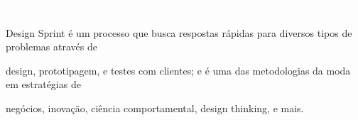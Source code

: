 \newcommand{\textBox}[1]{
\hspace*{7pt}
\begin{tabular}{  p{\dimexpr 0.97\linewidth-2\tabcolsep} }
  	{\normalsize #1}
\end{tabular}
\vspace*{10pt}
}

\newcommand{\designEntry}[2]{
	$\begin{array}{l}
	{\texttt{[image: \#1]}}
	\end{array}
	$ #2
}
\LARGE
\noindent\colorbox{materialYellow}
{\parbox[c][25pt][c]{\textwidth}{\hspace{15pt}\textcolor{white}{Design Sprint}}} %

\large
\vspace*{10pt}

\textcolor{materialYellow}{Design Sprint} é um processo que busca
respostas rápidas para diversos tipos de problemas através de

\vspace*{10pt}

design, prototipagem, e testes com clientes; e é uma das metodologias da moda em
estratégias de

\vspace*{10pt}

negócios, inovação, ciência comportamental, design thinking,
e mais.

\vspace*{10pt}
